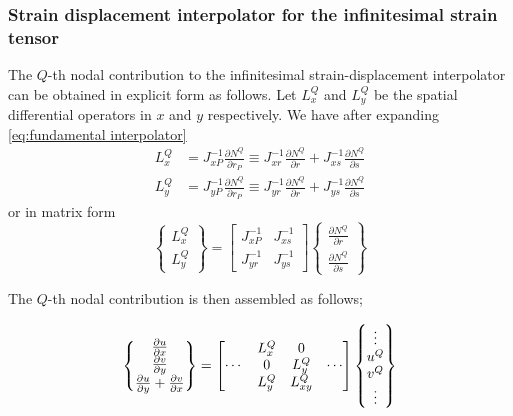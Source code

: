 \subsubsection*{Strain displacement interpolator for the infinitesimal strain tensor}
The $Q$-th nodal contribution to the infinitesimal strain-displacement interpolator can be obtained in explicit form as follows. Let $L_x^Q$ and $L_y^Q$ be the spatial differential operators in $x$ and $y$ respectively. We have after expanding \cref{eq:fundamental interpolator}
%
\begin{align*}
L_x^Q & = J_{xP}^{-1}\frac{\partial N^Q}{\partial r_P} \equiv J_{xr}^{-1}\frac{\partial N^Q}{\partial r} + J_{xs}^{-1}\frac{\partial N^Q}{\partial s}\\
L_y^Q & = J_{yP}^{-1}\frac{\partial N^Q}{\partial r_P} \equiv J_{yr}^{-1}\frac{\partial N^Q}{\partial r} + J_{ys}^{-1}\frac{\partial N^Q}{\partial s}
\end{align*}
%
or in matrix form
%
\begin{equation}
\begin{Bmatrix}
L_x^Q\\
L_y^Q
\end{Bmatrix} = 
\begin{bmatrix}
J_{xP}^{-1} &J_{xs}^{- 1}\\
J_{yr}^{-1} &J_{ys}^{- 1}
\end{bmatrix}
\begin{Bmatrix}
\frac{\partial N^Q}{\partial r}\\
\frac{\partial N^Q}{\partial s}
\end{Bmatrix}
\end{equation}

The $Q$-th nodal contribution is then assembled as follows;


\begin{equation}
\begin{Bmatrix}
\pdv{u}{x}\\
\pdv{v}{y}\\
\pdv{u}{y} + \pdv{v}{x}
\end{Bmatrix} =
\begin{bmatrix}
 &L_x^Q &0 \\
\cdots &0 &L_y^Q &\cdots\\
 &L_y^Q &L_{xy}^Q
\end{bmatrix}
\begin{Bmatrix}
\vdots\\
u^Q\\
v^Q\\
\vdots
\end{Bmatrix}
\label{eq:strain inter}
\end{equation}

